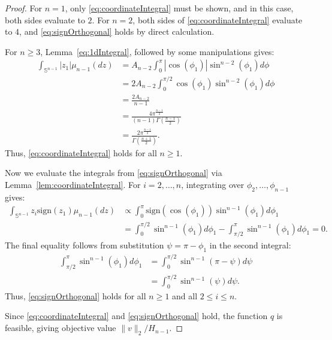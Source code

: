 \documentclass[10pt,a4paper]{amsart}
\newcommand{\sign}{\mathrm{sign}}
\renewcommand{\S}{\mathbb{S}}
\begin{document}
\begin{proof}
For $n=1$, only \eqref{eq:coordinateIntegral}  must be shown, and in this case, both sides evaluate to $2$. For $n=2$, both sides of \eqref{eq:coordinateIntegral} evaluate to $4$, and \eqref{eq:signOrthogonal} holds by direct calculation. 

For $n\ge 3$, Lemma~\ref{eq:1dIntegral}, followed by  some manipulations gives:
\begin{align*}
\int_{\S^{n-1}}|z_1|\mu_{n-1}(dz)&=A_{n-2}\int_0^\pi |\cos(\phi_1)|\sin^{n-2}(\phi_1)d\phi \\
&=2A_{n-2}\int_0^{\pi/2} \cos(\phi_1)\sin^{n-2}(\phi_1)d\phi \\
&=\frac{2A_{n-2}}{n-1} \\
&=\frac{4\pi^{\frac{n-1}{2}}}{(n-1)\Gamma\left(\frac{n-1}{2}\right)}\\
&=\frac{2\pi^{\frac{n-1}{2}}}{\Gamma\left(\frac{n+1}{2}\right)}.
\end{align*}
Thus, \eqref{eq:coordinateIntegral} holds for all $n\ge 1$.

Now we evaluate the integrals from \eqref{eq:signOrthogonal} via Lemma~\ref{lem:coordinateIntegral}. %
%
For $i=2,\ldots,n$, integrating over $\phi_2, \ldots, \phi_{n-1}$ gives:
\begin{align*}
\int_{\S^{n-1}}z_i\sign(z_1)\mu_{n-1}(dz)
&\propto \int_{0}^\pi \sign(\cos(\phi_1))\sin^{n-1}(\phi_1)d\phi_1 \\
&=\int_0^{\pi/2}\sin^{n-1}(\phi_1)d\phi_1 - \int_{\pi/2}^{\pi}\sin^{n-1}(\phi_1)d\phi_1 = 0.
\end{align*}
The final equality follows from substitution $\psi=\pi-\phi_1$ in the second integral:
\begin{align*}
\int_{\pi/2}^{\pi}\sin^{n-1}(\phi_1)d\phi_1 &=\int_0^{\pi/2}\sin^{n-1}(\pi-\psi)d\psi \\
&=\int_0^{\pi/2}\sin^{n-1}(\psi)d\psi. 
\end{align*}
Thus, \eqref{eq:signOrthogonal} holds for all $n\ge 1$ and all $2\le i \le n$.

Since \eqref{eq:coordinateIntegral} and \eqref{eq:signOrthogonal} hold, the function $q$ is feasible, giving objective value $\|v\|_2/H_{n-1}.$


\end{proof}
\end{document}
